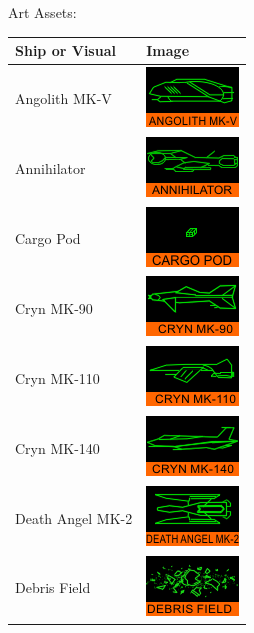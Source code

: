 \begin{itemize}
Art Assets:

\begin{tabular}{ | l | l | }
\hline
Ship or Visual & Image \\
\hline
Angolith MK-V & \includegraphics{images/ship_angolith_mk-v.png} \\
Annihilator & \includegraphics{images/ship_annihilator.png} \\
Cargo Pod & \includegraphics{images/ship_cargo_pod.png} \\
Cryn MK-90 & \includegraphics{images/ship_cryn_mk-90.png} \\
Cryn MK-110 & \includegraphics{images/ship_cryn_mk-110.png} \\
Cryn MK-140 & \includegraphics{images/ship_cryn_mk-140.png} \\
Death Angel MK-2 & \includegraphics{images/ship_deathangel_mk-2.png} \\
Debris Field & \includegraphics{images/ship_debris_field.png} \\

\end{tabular}
\end{itemize}
